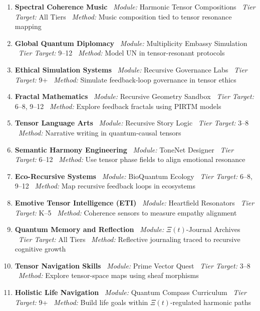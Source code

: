 \documentclass[11pt]{article}
\theoremstyle{plain}
\theoremstyle{definition}
\begin{document}
\begin{enumerate}[leftmargin=*]
\item \textbf{Spectral Coherence Music} \ \textit{Module:} Harmonic Tensor Compositions \ \textit{Tier Target:} All Tiers \ \textit{Method:} Music composition tied to tensor resonance mapping

\item \textbf{Global Quantum Diplomacy} \ \textit{Module:} Multiplicity Embassy Simulation \ \textit{Tier Target:} 9--12 \ \textit{Method:} Model UN in tensor-resonant protocols

\item \textbf{Ethical Simulation Systems} \ \textit{Module:} Recursive Governance Labs \ \textit{Tier Target:} 9+ \ \textit{Method:} Simulate feedback-loop governance in tensor ethics

\item \textbf{Fractal Mathematics} \ \textit{Module:} Recursive Geometry Sandbox \ \textit{Tier Target:} 6--8, 9--12 \ \textit{Method:} Explore feedback fractals using PIRTM models

\item \textbf{Tensor Language Arts} \ \textit{Module:} Recursive Story Logic \ \textit{Tier Target:} 3--8 \ \textit{Method:} Narrative writing in quantum-causal tensors

\item \textbf{Semantic Harmony Engineering} \ \textit{Module:} ToneNet Designer \ \textit{Tier Target:} 6--12 \ \textit{Method:} Use tensor phase fields to align emotional resonance

\item \textbf{Eco-Recursive Systems} \ \textit{Module:} BioQuantum Ecology \ \textit{Tier Target:} 6--8, 9--12 \ \textit{Method:} Map recursive feedback loops in ecosystems

\item \textbf{Emotive Tensor Intelligence (ETI)} \ \textit{Module:} Heartfield Resonators \ \textit{Tier Target:} K--5 \ \textit{Method:} Coherence sensors to measure empathy alignment

\item \textbf{Quantum Memory and Reflection} \ \textit{Module:} $\Xi(t)$-Journal Archives \ \textit{Tier Target:} All Tiers \ \textit{Method:} Reflective journaling traced to recursive cognitive growth

\item \textbf{Tensor Navigation Skills} \ \textit{Module:} Prime Vector Quest \ \textit{Tier Target:} 3--8 \ \textit{Method:} Explore tensor-space maps using sheaf morphisms

\item \textbf{Holistic Life Navigation} \ \textit{Module:} Quantum Compass Curriculum \ \textit{Tier Target:} 9+ \ \textit{Method:} Build life goals within $\Xi(t)$-regulated harmonic paths
\end{enumerate}
\end{document}
